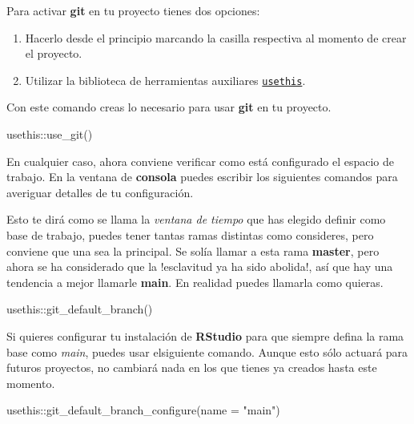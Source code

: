 \documentclass[
  letterpaper,
  DIV=11,
  numbers=noendperiod]{scrartcl}
\newenvironment{Shaded}{\begin{snugshade}}{\end{snugshade}}
\newcommand{\AttributeTok}[1]{\textcolor[rgb]{0.40,0.45,0.13}{#1}}
\newcommand{\FunctionTok}[1]{\textcolor[rgb]{0.28,0.35,0.67}{#1}}
\newcommand{\NormalTok}[1]{\textcolor[rgb]{0.00,0.23,0.31}{#1}}
\newcommand{\SpecialCharTok}[1]{\textcolor[rgb]{0.37,0.37,0.37}{#1}}
\newcommand{\StringTok}[1]{\textcolor[rgb]{0.13,0.47,0.30}{#1}}
\providecommand{\tightlist}{%
  \setlength{\itemsep}{0pt}\setlength{\parskip}{0pt}}\usepackage{longtable,booktabs,array}
\begin{document}
Para activar \textbf{git} en tu proyecto tienes dos opciones:

\begin{enumerate}
\def\labelenumi{\arabic{enumi}.}
\tightlist
\item
  Hacerlo desde el principio marcando la casilla respectiva al momento
  de crear el proyecto.
\item
  Utilizar la biblioteca de herramientas auxiliares
  \href{https://usethis.r-lib.org/articles/git-credentials.html}{\texttt{usethis}}.
\end{enumerate}

Con este comando creas lo necesario para usar \textbf{git} en tu
proyecto.

\begin{Shaded}
\begin{Highlighting}[]
\NormalTok{usethis}\SpecialCharTok{::}\FunctionTok{use\_git}\NormalTok{()}
\end{Highlighting}
\end{Shaded}

En cualquier caso, ahora conviene verificar como está configurado el
espacio de trabajo. En la ventana de \textbf{consola} puedes escribir
los siguientes comandos para averiguar detalles de tu configuración.

Esto te dirá como se llama la \emph{ventana de tiempo} que has elegido
definir como base de trabajo, puedes tener tantas ramas distintas como
consideres, pero conviene que una sea la principal. Se solía llamar a
esta rama \textbf{master}, pero ahora se ha considerado que la
!esclavitud ya ha sido abolida!, así que hay una tendencia a mejor
llamarle \textbf{main}. En realidad puedes llamarla como quieras.

\begin{Shaded}
\begin{Highlighting}[]
\NormalTok{usethis}\SpecialCharTok{::}\FunctionTok{git\_default\_branch}\NormalTok{()}
\end{Highlighting}
\end{Shaded}

Si quieres configurar tu instalación de \textbf{RStudio} para que
siempre defina la rama base como \emph{main}, puedes usar elsiguiente
comando. Aunque esto sólo actuará para futuros proyectos, no cambiará
nada en los que tienes ya creados hasta este momento.

\begin{Shaded}
\begin{Highlighting}[]
\NormalTok{usethis}\SpecialCharTok{::}\FunctionTok{git\_default\_branch\_configure}\NormalTok{(}\AttributeTok{name =} \StringTok{"main"}\NormalTok{)}
\end{Highlighting}
\end{Shaded}
\end{document}
